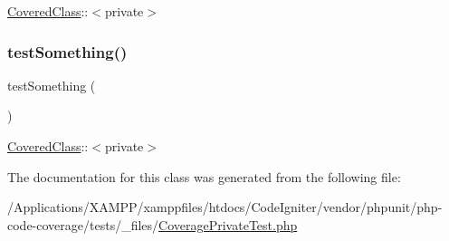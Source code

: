\mbox{\hyperlink{class_covered_class}{Covered\+Class}}\+:\+:$<$private$>$ \mbox{\label{class_coverage_private_test_a0fc4e17369bc9607ebdd850d9eda8167}} 
\subsubsection{\texorpdfstring{test\+Something()}{testSomething()}\hspace{0.1cm}{\footnotesize\ttfamily [2/2]}}
{\footnotesize\ttfamily test\+Something (\begin{DoxyParamCaption}{ }\end{DoxyParamCaption})}

\mbox{\hyperlink{class_covered_class}{Covered\+Class}}\+:\+:$<$private$>$ 

The documentation for this class was generated from the following file\+:\begin{DoxyCompactItemize}
\item 
/\+Applications/\+X\+A\+M\+P\+P/xamppfiles/htdocs/\+Code\+Igniter/vendor/phpunit/php-\/code-\/coverage/tests/\+\_\+files/\mbox{\hyperlink{php-code-coverage_2tests_2__files_2_coverage_private_test_8php}{Coverage\+Private\+Test.\+php}}\end{DoxyCompactItemize}
